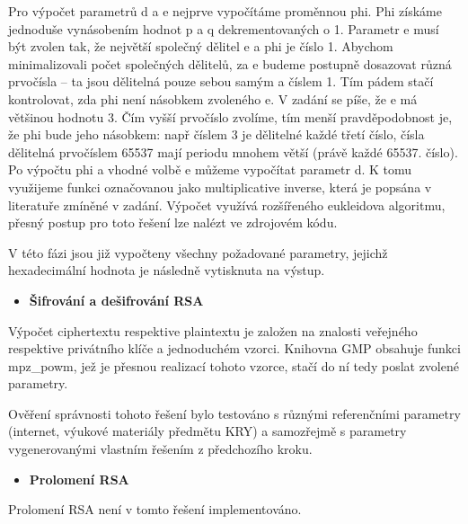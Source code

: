 \documentclass[11pt,a4paper]{article}
\begin{document}
Pro výpočet parametrů d a e nejprve vypočítáme proměnnou phi. Phi získáme jednoduše vynásobením hodnot p a q dekrementovaných o 1. Parametr e musí být zvolen tak, že největší společný dělitel e a phi je číslo 1. Abychom minimalizovali počet společných dělitelů, za e budeme postupně dosazovat různá prvočísla -- ta jsou dělitelná pouze sebou samým a číslem 1. Tím pádem stačí kontrolovat, zda phi není násobkem zvoleného e. V zadání se píše, že e má většinou hodnotu 3. Čím vyšší prvočíslo zvolíme, tím menší pravděpodobnost je, že phi bude jeho násobkem: např číslem 3 je dělitelné každé třetí číslo, čísla dělitelná prvočíslem 65537 mají periodu mnohem větší (právě každé 65537. číslo). Po výpočtu phi a vhodné volbě e můžeme vypočítat parametr d. K tomu využijeme funkci označovanou jako multiplicative inverse, která je popsána v literatuře zmíněné v zadání. Výpočet využívá rozšířeného eukleidova algoritmu, přesný postup pro toto řešení lze nalézt ve zdrojovém kódu.

V této fázi jsou již vypočteny všechny požadované parametry, jejichž hexadecimální hodnota je následně vytisknuta na výstup.



\begin{itemize}[leftmargin=0cm]
\item{\textbf{Šifrování a dešifrování RSA}}
\end{itemize}
Výpočet ciphertextu respektive plaintextu je založen na znalosti veřejného respektive privátního klíče a jednoduchém vzorci. Knihovna GMP obsahuje funkci mpz\_powm, jež je přesnou realizací tohoto vzorce, stačí do ní tedy poslat zvolené parametry.

Ověření správnosti tohoto řešení bylo testováno s různými referenčními parametry (internet, výukové materiály předmětu KRY) a samozřejmě s parametry vygenerovanými vlastním řešením z předchozího kroku.


\begin{itemize}[leftmargin=0cm]
\item{\textbf{Prolomení RSA}}
\end{itemize}
Prolomení RSA není v tomto řešení implementováno.
\end{document}
